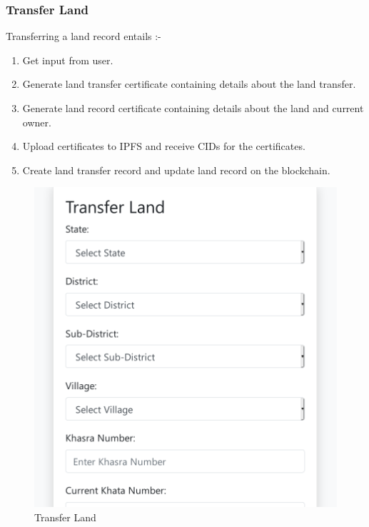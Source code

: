 \documentclass{article}
\begin{document}
        \subsubsection{Transfer Land}
            Transferring a land record entails :-
            \begin{enumerate}
                \item Get input from user.
                \item Generate land transfer certificate containing details about the land transfer.
                \item Generate land record certificate containing details about the land and current owner.
                \item Upload certificates to IPFS and receive CIDs for the certificates.
                \item Create land transfer record and update land record on the blockchain.
            \end{enumerate}
            \begin{figure}[htbp]
                \includegraphics[scale=0.25]{records_transfer}
                \centering
                \caption{Transfer Land}
            \end{figure}
\end{document}
